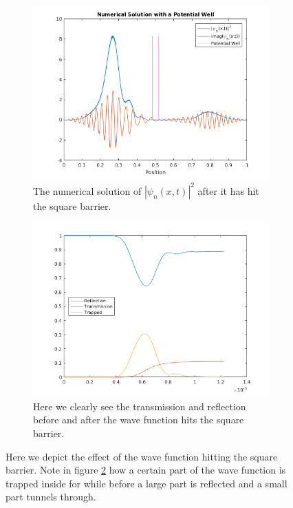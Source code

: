 \documentclass[11pt]{article}
\newlength\figureheight
\newlength\figurewidth
\begin{document}
\begin{figure}[H]
	\centering
	\begin{subfigure}{.9\linewidth}
		\includegraphics[width=1\textwidth]{../src/plots/squareBarrPlot.png}
		\caption{The numerical solution of $|\psi_n(x,t)|^2$ after it has hit the square barrier.}
		\label{fig:squareBarrfPlot}
	\end{subfigure}
	\begin{subfigure}{.9\linewidth}
		\setlength{}
		\setlength{}
		\includegraphics[width=1\textwidth]{../src/plots/squareBarrTR.png}
		\caption{Here we clearly see the transmission and reflection before and after the wave function hits the square barrier.}
		\label{fig:squareBarrTR}
	\end{subfigure}
	\label{fig:squareBarr}
	\caption{Here we depict the effect of the wave function hitting the square barrier. Note in figure \ref{fig:squareBarrTR} how a certain part of the wave function is trapped inside for while before a large part is reflected and a small part tunnels through.}
\end{figure}
\end{document}
